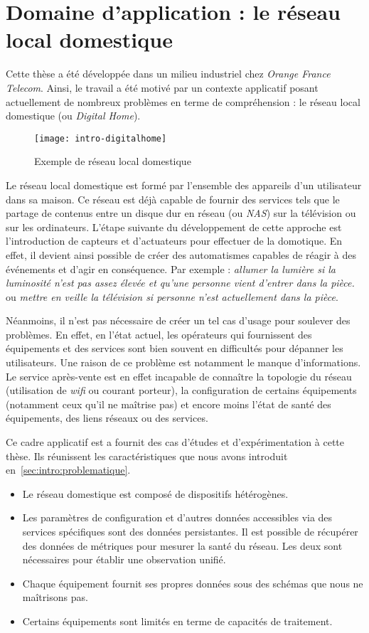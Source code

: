 \section{Domaine d'application : le réseau local domestique}\label{sec:introduction:digitalhome}
Cette thèse a été développée dans un milieu industriel chez \textit{Orange France Telecom}. Ainsi, le travail a été motivé par un contexte applicatif posant actuellement de nombreux problèmes en terme de compréhension : le réseau local domestique (ou \textit{Digital Home}).

\begin{figure}[ht]
\centering
\texttt{[image: intro-digitalhome]}
\caption{Exemple de réseau local domestique}
\end{figure}

Le réseau local domestique est formé par l'ensemble des appareils d'un utilisateur dans sa maison. Ce réseau est déjà capable de fournir des services tels que le partage de contenus entre un disque dur en réseau (ou \textit{NAS}) sur la télévision ou sur les ordinateurs. L'étape suivante du développement de cette approche est l'introduction de capteurs et d'actuateurs pour effectuer de la domotique. En effet, il devient ainsi possible de créer des automatismes capables de réagir à des événements et d'agir en conséquence. Par exemple : \textit{allumer la lumière si la luminosité n'est pas assez élevée et qu'une personne vient d'entrer dans la pièce.} ou \textit{mettre en veille la télévision si personne n'est actuellement dans la pièce}.

Néanmoins, il n'est pas nécessaire de créer un tel cas d'usage pour soulever des problèmes. En effet, en l'état actuel, les opérateurs qui fournissent des équipements et des services sont bien souvent en difficultés pour dépanner les utilisateurs. Une raison de ce problème est notamment le manque d'informations. Le service après-vente est en effet incapable de connaître la topologie du réseau (utilisation de \textit{wifi} ou courant porteur), la configuration de certains équipements (notamment ceux qu'il ne maîtrise pas) et encore moins l'état de santé des équipements, des liens réseaux ou des services.

Ce cadre applicatif est a fournit des cas d'études et d'expérimentation à cette thèse. Ils réunissent les caractéristiques que nous avons introduit en~\ref{sec:intro:problematique}.
\begin{itemize}
	\item Le réseau domestique est composé de dispositifs hétérogènes.
	\item Les paramètres de configuration et d'autres données accessibles via des services spécifiques sont des données persistantes. Il est possible de récupérer des données de métriques pour mesurer la santé du réseau. Les deux sont nécessaires pour établir une observation unifié.
	\item Chaque équipement fournit ses propres données sous des schémas que nous ne maîtrisons pas.
	\item Certains équipements sont limités en terme de capacités de traitement.
\end{itemize}

